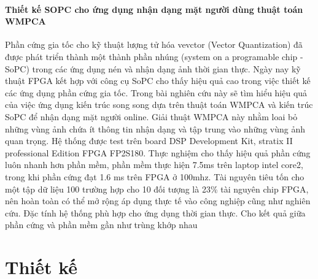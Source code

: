 \documentclass[a4paper]{report}
\begin{document}
\subsubsection*{Thiết kế SOPC cho ứng dụng nhận dạng mặt người dùng thuật toán WMPCA \cite{cttrongnuoc}}
Phần cứng gia tốc cho kỹ thuật lượng tử hóa vevctor (Vector Quantization) đã được phát triển thành một thành phần nhúng (system on a programable chip - SoPC)  trong các ứng dụng nén và nhận dạng ảnh thời gian thực. Ngày nay kỹ thuật FPGA kết hợp với công cụ SoPC cho thấy hiệu quả cao trong việc thiết kế các ứng dụng phần cứng gia tốc. Trong bài nghiên cứu này sẽ tìm hiểu hiệu quả của việc ứng dụng kiến trúc song song dựa trên thuật toán WMPCA và kiến trúc SoPC để nhận dạng mặt người online. Giải thuật WMPCA này nhằm loai bỏ những vùng ảnh chứa ít thông tin nhận dạng và tập trung vào những vùng ảnh quan trọng. Hệ thống được test trên  board  DSP Development Kit, stratix II professional Edition FPGA FP2S180. Thực nghiệm cho thấy hiệu quả phần cứng luôn nhanh hơn phần mềm, phần mềm thực hiện 7.5ms trên laptop intel core2, trong khi phần cứng đạt 1.6 ms trên FPGA ở 100mhz. Tài nguyên tiêu tốn cho một tập dữ liệu 100 trường hợp cho 10 đối tượng là 23\% tài nguyên chip FPGA, nên hoàn toàn có thể mở rộng áp dụng thực tế vào công nghiệp cũng như nghiên cứu. Đặc tính hệ thống phù hợp cho ứng dụng thời gian thực. Cho kết quả giữa phần cứng và phần mềm gần như trùng khớp nhau

\chapter{Thiết kế}
\end{document}
